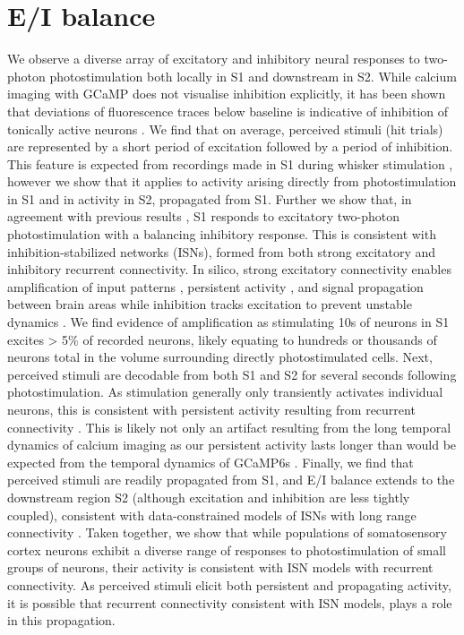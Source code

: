 \section{E/I balance}
We observe a diverse array of excitatory and inhibitory neural responses to two-photon photostimulation both locally in S1 and downstream in S2. While calcium imaging with GCaMP does not visualise inhibition explicitly, it has been shown that deviations of fluorescence traces below baseline is indicative of inhibition of tonically active neurons \cite{vanwalleghem_calcium_2021}. We find that on average, perceived stimuli (hit trials) are represented by a short period of excitation followed by a period of inhibition. This feature is expected from recordings made in S1 during whisker stimulation \cite{gabernet_somatosensory_2005, wilent_dynamics_2005}, however we show that it applies to activity arising directly from photostimulation in S1 and in activity in S2, propagated from S1.  Further we show that, in agreement with previous results \cite{dalgleish_how_2020}, S1 responds to excitatory two-photon photostimulation with a balancing inhibitory response. This is consistent with inhibition-stabilized networks (ISNs), formed from both strong excitatory and inhibitory recurrent connectivity. In silico, strong excitatory connectivity enables amplification of input patterns \cite{murphy_balanced_2009}, persistent activity \cite{amit_model_1997}, and signal propagation between brain areas \cite{joglekar_inter-areal_2018} while inhibition tracks excitation to prevent unstable dynamics \cite{sanzeni_inhibition_2020}. We find evidence of amplification as stimulating 10s of neurons in S1 excites > 5\% of recorded neurons, likely equating to hundreds or thousands of neurons total in the volume surrounding directly photostimulated cells. Next, perceived stimuli are decodable from both S1 and S2 for several seconds following photostimulation. As stimulation generally only transiently activates individual neurons, this is consistent with persistent activity resulting from recurrent connectivity \cite{daie_targeted_2021, seung_how_1996}. This is likely not only an artifact resulting from the long temporal dynamics of calcium imaging as our persistent activity lasts longer than would be expected from the temporal dynamics of GCaMP6s \cite{daie_targeted_2021, chen_ultrasensitive_2013}. Finally, we find that perceived stimuli are readily propagated from S1, and E/I balance extends to the downstream region S2 (although excitation and inhibition are less tightly coupled), consistent with data-constrained models of ISNs with long range connectivity \cite{joglekar_inter-areal_2018}. Taken together, we show that while populations of somatosensory cortex neurons exhibit a diverse range of responses to photostimulation of small groups of neurons, their activity is consistent with ISN models with recurrent connectivity. As perceived stimuli elicit both persistent and propagating activity, it is possible that recurrent connectivity consistent with ISN models, plays a role in this propagation.

